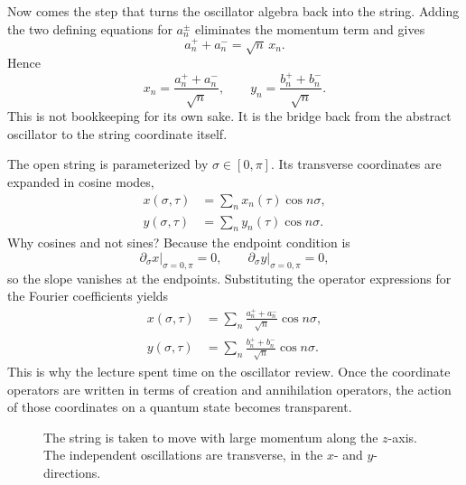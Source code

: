 Now comes the step that turns the oscillator algebra back into the string. Adding the two defining equations for \(a_n^\pm\) eliminates the momentum term and gives
\begin{equation}
a_n^++a_n^-=\sqrt n\,x_n.
\end{equation}
Hence
\begin{equation}
x_n=\frac{a_n^++a_n^-}{\sqrt n},\qquad
y_n=\frac{b_n^++b_n^-}{\sqrt n}.
\end{equation}
This is not bookkeeping for its own sake. It is the bridge back from the abstract oscillator to the string coordinate itself.

The open string is parameterized by \(\sigma\in[0,\pi]\). Its transverse coordinates are expanded in cosine modes,
\begin{align}
x(\sigma,\tau) &= \sum_n x_n(\tau)\cos n\sigma, \\
y(\sigma,\tau) &= \sum_n y_n(\tau)\cos n\sigma.
\end{align}
Why cosines and not sines? Because the endpoint condition is
\begin{equation}
\partial_\sigma x\big|_{\sigma=0,\pi}=0,\qquad
\partial_\sigma y\big|_{\sigma=0,\pi}=0,
\end{equation}
so the slope vanishes at the endpoints. Substituting the operator expressions for the Fourier coefficients yields
\begin{align}
x(\sigma,\tau) &= \sum_n \frac{a_n^++a_n^-}{\sqrt n}\cos n\sigma, \\
y(\sigma,\tau) &= \sum_n \frac{b_n^++b_n^-}{\sqrt n}\cos n\sigma.
\end{align}
This is why the lecture spent time on the oscillator review. Once the coordinate operators are written in terms of creation and annihilation operators, the action of those coordinates on a quantum state becomes transparent.

\begin{figure}[t]
\centering
{}
\caption{The string is taken to move with large momentum along the \(z\)-axis. The independent oscillations are transverse, in the \(x\)- and \(y\)-directions.}
\end{figure}

